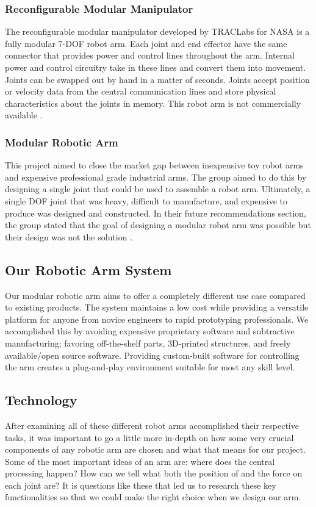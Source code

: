 \subsubsection{Reconfigurable Modular Manipulator}
The reconfigurable modular manipulator developed by TRACLabs for NASA is a fully modular 7-DOF robot arm. Each joint and end effector have the same connector that provides power and control lines throughout the arm. Internal power and control circuitry take in these lines and convert them into movement. Joints can be swapped out by hand in a matter of seconds. Joints accept position or velocity data from the central communication lines and store physical characteristics about the joints in memory. This robot arm is not commercially available \cite{RMM}.

\subsubsection{Modular Robotic Arm}
This project aimed to close the market gap between inexpensive toy robot arms and expensive professional grade industrial arms. The group aimed to do this by designing a single joint that could be used to assemble a robot arm. Ultimately, a single DOF joint that was heavy, difficult to manufacture, and expensive to produce was designed and constructed. In their future recommendations section, the group stated that the goal of designing a modular robot arm was possible but their design was not the solution \cite{MRA}.

\subsection{Our Robotic Arm System}
Our modular robotic arm aims to offer a completely different use case compared to existing products. The system maintains a low cost while providing a versatile platform for anyone from novice engineers to rapid prototyping professionals. We accomplished this by avoiding expensive proprietary software and subtractive manufacturing; favoring off-the-shelf parts, 3D-printed structures, and freely available/open source software. Providing custom-built software for controlling the arm creates a plug-and-play environment suitable for most any skill level.

\subsection{Technology}
After examining all of these different robot arms accomplished their respective tasks, it was important to go a little more in-depth on how some very crucial components of any robotic arm are chosen and what that means for our project. Some of the most important ideas of an arm are: where does the central processing happen? How can we tell what both the position of and the force on each joint are? It is questions like these that led us to research these key functionalities so that we could make the right choice when we design our arm.  

